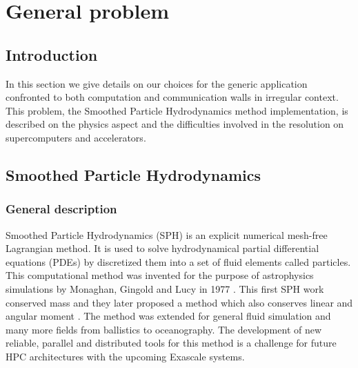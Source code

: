 \chapter{General problem}

\section{Introduction}
In this section we give details on our choices for the generic application confronted to both computation and communication walls in irregular context. 
This problem, the Smoothed Particle Hydrodynamics method implementation, is described on the physics aspect and the difficulties involved in the resolution on supercomputers and accelerators.  

\section{Smoothed Particle Hydrodynamics}

\subsection{General description}
Smoothed Particle Hydrodynamics (SPH) is an explicit numerical mesh-free Lagrangian method.
It is used to solve hydrodynamical partial differential equations (PDEs) by discretized them into a set of fluid elements called particles. 
This computational method was invented for the purpose of astrophysics simulations by Monaghan, Gingold and Lucy in 1977 \cite{lucy1977numerical,gingold1977smoothed}. 
This first SPH work conserved mass and they later proposed a method which also conserves linear and angular moment \cite{gingold1982kernel}. 
The method was extended for general fluid simulation and many more fields from ballistics to oceanography.
The development of new reliable, parallel and distributed tools for this method is a challenge for future HPC architectures with the upcoming Exascale systems.

